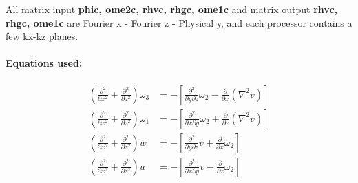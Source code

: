 \documentclass[titlepage,12pt,letter]{article}
\newcommand{\p}{\partial}
\newcommand{\paren}[1]{\left( #1 \right)}
\newcommand{\bracket}[1]{\left[ #1 \right]}
\numberwithin{equation}{section}
\begin{document}
All matrix input \textbf{phic, ome2c, rhvc, rhgc, ome1c} and matrix output \textbf{rhvc, rhgc, ome1c} are Fourier x - Fourier z - Physical y, and each processor contains a few kx-kz planes.

\newpage
\paragraph{Equations used:}
\begin{align}
	\paren{\frac{\p^2}{\p x^2}+\frac{\p^2}{\p z^2}} \omega_3  &= -\bracket{\frac{\p^2 }{\p y \p z} \omega_2 - \frac{\p}{\p x}\paren{\nabla^2 v}} \label{eq:om3}\\
	\paren{\frac{\p^2}{\p x^2}+\frac{\p^2}{\p z^2}} \omega_1  &= -\bracket{\frac{\p^2 }{\p x \p y } \omega_2 + \frac{\p}{\p z}\paren{\nabla^2 v}} \label{eq:om1}\\
	\paren{\frac{\p^2}{\p x^2}+\frac{\p^2}{\p z^2}} w  &= -\bracket{\frac{\p^2 }{\p y \p z} v + \frac{\p}{\p x}\omega_2} \label{eq:w}\\
	\paren{\frac{\p^2}{\p x^2}+\frac{\p^2}{\p z^2}} u  &= -\bracket{\frac{\p^2 }{\p x \p y} v - \frac{\p}{\p z}\omega_2} \label{eq:u}
\end{align}
\end{document}

